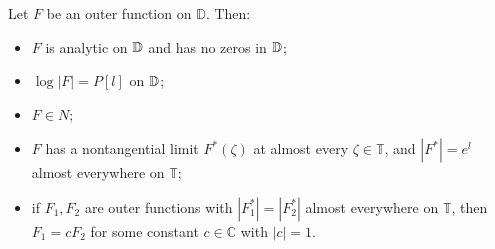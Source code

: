 \begin{theorem}\label{thm:outer_function_properties}
Let $F$ be an outer function on $\mathbb{D}$. Then:
\begin{itemize}
  \item[(a)] $F$ is analytic on $\mathbb{D}$ and has no zeros in $\mathbb{D}$;
  \item[(b)] $\log|F|=P[l]$ on $\mathbb{D}$;
  \item[(c)] $F\in N$;
  \item[(d)] $F$ has a nontangential limit $F^*(\zeta)$ at almost every $\zeta\in\mathbb{T}$, and
  $|F^*|=e^{l}$ almost everywhere on $\mathbb{T}$;
  \item[(e)] if $F_1,F_2$ are outer functions with $|F_1^*|=|F_2^*|$ almost everywhere on
  $\mathbb{T}$, then $F_1=cF_2$ for some constant $c\in\mathbb{C}$ with $|c|=1$.
\end{itemize}
\end{theorem}
